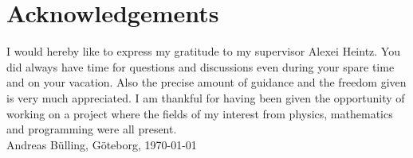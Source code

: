 \newpage
\clearpage
\mbox{}
\newpage
\clearpage
\thispagestyle{empty}
\section*{Acknowledgements}
I would hereby like to express my gratitude to my supervisor Alexei
Heintz. You did always have time for questions and discussions even
during your spare time and on your vacation. Also the precise amount
of guidance and the freedom given is very much appreciated. I am
thankful for having been given the opportunity of working on a project
where the fields of my interest from physics, mathematics and
programming were all present.  \\[1cm]

\hfill Andreas B\"{u}lling, G\"{o}teborg, \today
\newpage
\clearpage
\mbox{}

